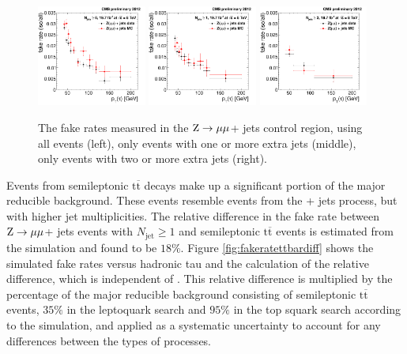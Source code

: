 \documentclass[12pt]{thesis}  %
\renewcommand{\ttbar}{\ensuremath{\mathrm{t}\overline{\mathrm{t}}}\xspace}
\newcommand{\ra}{\ensuremath{\rightarrow}}%
\newcommand{\Zmm}{\ensuremath{\Z \ra \mu\mu}\xspace}%
\begin{document}
\begin{figure}[hbt]
  \begin{center}
    \includegraphics[width=0.32\textwidth]{figures/bkgEstim/tfr_dmc.pdf}
    \includegraphics[width=0.32\textwidth]{figures/bkgEstim/tfr_dmc_1jet.pdf}
    \includegraphics[width=0.32\textwidth]{figures/bkgEstim/tfr_dmc_2jet.pdf}
    \caption{The fake rates measured in the \Zmm + jets control region, using all events (left), only events with one or more extra jets (middle), only events with two or more extra jets (right). \label{Bkg:fig:fakerate}}
  \end{center}
\end{figure}

Events from semileptonic \ttbar decays make up a significant portion of the major reducible background. These events resemble events from the \W + jets process, but with higher jet multiplicities. The relative difference in the fake rate between \Zmm + jets events with $N_{\text{jet}} \geq 1$ and semileptonic \ttbar events is estimated from the simulation and found to be $18\%$. Figure \ref{fig:fakeratettbardiff} shows the simulated fake rates versus hadronic tau \pt and the calculation of the relative difference, which is independent of \pt. This relative difference is multiplied by the percentage of the major reducible background consisting of semileptonic \ttbar events, $35\%$ in the leptoquark search and $95\%$ in the top squark search according to the simulation, and applied as a systematic uncertainty to account for any differences between the types of processes.
\end{document}
